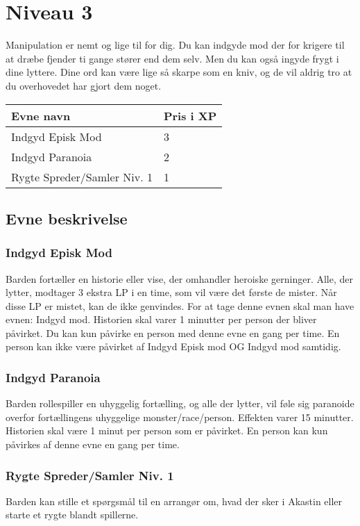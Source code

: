 \chapter*{Niveau 3}
Manipulation er nemt og lige til for dig. Du kan indgyde mod der for krigere til at dræbe fjender ti gange stører end dem selv. Men du kan også ingyde frygt i dine lyttere. Dine ord kan være lige så skarpe som en kniv, og de vil aldrig tro at du overhovedet har gjort dem noget.

\begin{table}[H]
    \centering
    \begin{tabular}{|p{}|p{}|}
    \rowcolor{cerulean!80}\hline
        Evne navn & Pris i XP \\\hline
        Indgyd Episk Mod &3\\\hline
        Indgyd Paranoia &2\\\hline
        Rygte Spreder/Samler Niv. 1 &1\\\hline
    \end{tabular}
\end{table}
\section*{Evne beskrivelse}

\subsection*{Indgyd Episk Mod}
Barden fortæller en historie eller vise, der omhandler heroiske gerninger. Alle, der lytter, modtager 3 ekstra LP i en time, som vil være det første de mister. Når disse LP er mistet, kan de ikke genvindes. For at tage denne evnen skal man have evnen: Indgyd mod. Historien skal varer 1 minutter per person der bliver påvirket. Du kan kun påvirke en person med denne evne en gang per time. En person kan ikke være påvirket af Indgyd Episk mod OG Indgyd mod samtidig.

\subsection*{Indgyd Paranoia}
Barden rollespiller en uhyggelig fortælling, og alle der lytter, vil føle sig paranoide overfor fortællingens uhyggelige monster/race/person. Effekten varer 15 minutter. Historien skal være 1 minut per person som er påvirket. En person kan kun påvirkes af denne evne en gang per time.


\subsection*{Rygte Spreder/Samler Niv. 1}
Barden kan stille et spørgsmål til en arrangør om, hvad der sker i Akastin eller starte et rygte blandt spillerne.
